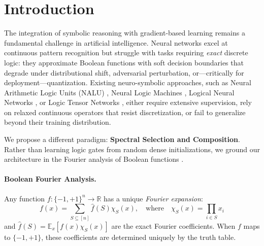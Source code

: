 \documentclass[Royal,times,sageh]{sagej}
\begin{document}

\maketitle

\section{Introduction}

The integration of symbolic reasoning with gradient-based learning remains a fundamental challenge in artificial intelligence. Neural networks excel at continuous pattern recognition but struggle with tasks requiring \textit{exact} discrete logic: they approximate Boolean functions with soft decision boundaries that degrade under distributional shift, adversarial perturbation, or---critically for deployment---quantization. Existing neuro-symbolic approaches, such as Neural Arithmetic Logic Units (NALU) \cite{trask2018neural}, Neural Logic Machines \cite{dong2019neural}, Logical Neural Networks \cite{riegel2020logical}, or Logic Tensor Networks \cite{serafini2016learning}, either require extensive supervision, rely on relaxed continuous operators that resist discretization, or fail to generalize beyond their training distribution.

We propose a different paradigm: \textbf{Spectral Selection and Composition}. Rather than learning logic gates from random dense initializations, we ground our architecture in the Fourier analysis of Boolean functions \cite{odonnell2014analysis}.

\paragraph{Boolean Fourier Analysis.} Any function $f: \{-1, +1\}^n \to \mathbb{R}$ has a unique \textit{Fourier expansion}:
\begin{equation}
\label{eq:fourier}
    f(x) = \sum_{S \subseteq [n]} \hat{f}(S) \chi_S(x), \quad \text{where} \quad \chi_S(x) = \prod_{i \in S} x_i
\end{equation}
and $\hat{f}(S) = \mathbb{E}_{x}[f(x) \chi_S(x)]$ are the exact Fourier coefficients. When $f$ maps to $\{-1, +1\}$, these coefficients are determined uniquely by the truth table.
\end{document}

